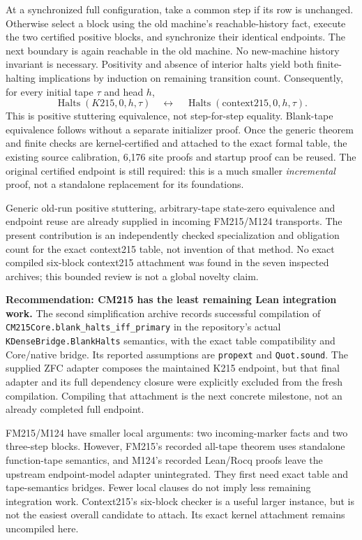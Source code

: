 \documentclass[11pt]{article}
\begin{document}
At a synchronized full configuration, take a common step if its row is unchanged. Otherwise select a block using the old machine's reachable-history fact, execute the two certified positive blocks, and synchronize their identical endpoints. The next boundary is again reachable in the old machine. No new-machine history invariant is necessary. Positivity and absence of interior halts yield both finite-halting implications by induction on remaining transition count. Consequently, for every initial tape $\tau$ and head $h$,
\[
 \operatorname{Halts}(K215,0,h,\tau)
 \quad\longleftrightarrow\quad
 \operatorname{Halts}(\mathrm{context215},0,h,\tau).
\]
This is positive stuttering equivalence, not step-for-step equality. Blank-tape equivalence follows without a separate initializer proof. Once the generic theorem and finite checks are kernel-certified and attached to the exact formal table, the existing source calibration, 6,176 site proofs and startup proof can be reused. The original certified endpoint is still required: this is a much smaller \emph{incremental} proof, not a standalone replacement for its foundations.

Generic old-run positive stuttering, arbitrary-tape state-zero equivalence and endpoint reuse are already supplied in incoming FM215/M124 transports. The present contribution is an independently checked specialization and obligation count for the exact context215 table, not invention of that method. No exact compiled six-block context215 attachment was found in the seven inspected archives; this bounded review is not a global novelty claim.

\textbf{Recommendation: CM215 has the least remaining Lean integration work.} The second simplification archive records successful compilation of \texttt{CM215Core.blank\_halts\_iff\_primary} in the repository's actual \texttt{KDenseBridge.BlankHalts} semantics, with the exact table compatibility and Core/native bridge. Its reported assumptions are \texttt{propext} and \texttt{Quot.sound}. The supplied ZFC adapter composes the maintained K215 endpoint, but that final adapter and its full dependency closure were explicitly excluded from the fresh compilation. Compiling that attachment is the next concrete milestone, not an already completed full endpoint.

FM215/M124 have smaller local arguments: two incoming-marker facts and two three-step blocks. However, FM215's recorded all-tape theorem uses standalone function-tape semantics, and M124's recorded Lean/Rocq proofs leave the upstream endpoint-model adapter unintegrated. They first need exact table and tape-semantics bridges. Fewer local clauses do not imply less remaining integration work. Context215's six-block checker is a useful larger instance, but is not the easiest overall candidate to attach. Its exact kernel attachment remains uncompiled here.
\end{document}
